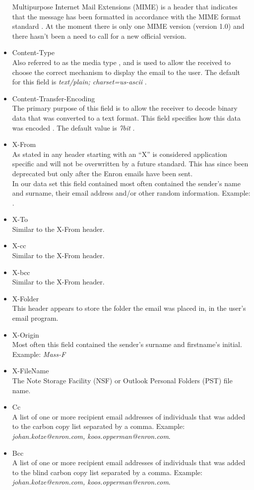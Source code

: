 \documentclass[hidelinks,english]{article}
\begin{document}
\begin{itemize}
						Multipurpose Internet Mail Extensions (MIME) is a header that indicates that the message has been formatted in accordance with the MIME format standard \cite{rfc2045}. At the moment there is only one MIME version (version 1.0) \cite{rfc2045} and there hasn't been a need to call for a new official version.
					\item Content-Type\\
						Also referred to as the media type \cite{rfc2045}, and is used to allow the received to choose the correct mechanism to display the email to the user. The default for this field is \textit{text/plain; charset=us-ascii} \cite{rfc2045}.
					\item Content-Transfer-Encoding\\
						The primary purpose of this field is to allow the receiver to decode binary data that was converted to a text format. This field specifies how this data was encoded \cite{rfc2045}. The default value is \textit{7bit} \cite{rfc2045}.
					\item X-From\\
						As stated in \cite{rfc822} any header starting with an ``X'' is considered application specific and will not be overwritten by a future standard. This has since been deprecated \cite{rfc6648} but only after the Enron emails have been sent.\\
						In our data set this field contained most often contained the sender's name and surname, their email address and/or other random information. Example: .
					\item X-To\\
						Similar to the X-From header.
					\item X-cc\\
						Similar to the X-From header.
					\item X-bcc\\
						Similar to the X-From header.
					\item X-Folder\\
						This header appears to store the folder the email was placed in, in the user's email program.
					\item X-Origin\\
						Most often this field contained the sender's surname and firstname's initial. Example: \textit{Mass-F}
					\item X-FileName\\
						The Note Storage Facility (NSF) or Outlook Personal Folders (PST) file name.
					\item Cc\\
							A list of one or more recipient email addresses of individuals that was added to the carbon copy list separated by a comma. Example: \textit{johan.kotze@enron.com, koos.opperman@enron.com}.
					\item Bcc\\
							A list of one or more recipient email addresses of individuals that was added to the blind carbon copy list separated by a comma. Example: \textit{johan.kotze@enron.com, koos.opperman@enron.com}.
				\end{itemize}
				
\end{document}
